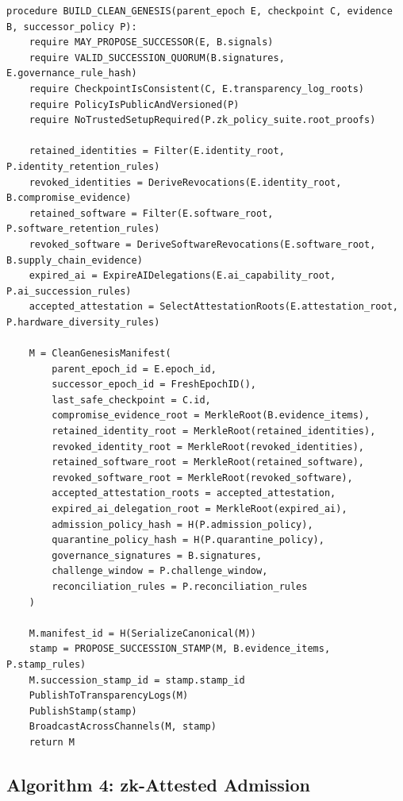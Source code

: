 \documentclass[11pt,letterpaper]{article}
\begin{document}
\begin{lstlisting}[caption={Constructing a Clean Genesis Manifest}]
procedure BUILD_CLEAN_GENESIS(parent_epoch E, checkpoint C, evidence B, successor_policy P):
    require MAY_PROPOSE_SUCCESSOR(E, B.signals)
    require VALID_SUCCESSION_QUORUM(B.signatures, E.governance_rule_hash)
    require CheckpointIsConsistent(C, E.transparency_log_roots)
    require PolicyIsPublicAndVersioned(P)
    require NoTrustedSetupRequired(P.zk_policy_suite.root_proofs)

    retained_identities = Filter(E.identity_root, P.identity_retention_rules)
    revoked_identities = DeriveRevocations(E.identity_root, B.compromise_evidence)
    retained_software = Filter(E.software_root, P.software_retention_rules)
    revoked_software = DeriveSoftwareRevocations(E.software_root, B.supply_chain_evidence)
    expired_ai = ExpireAIDelegations(E.ai_capability_root, P.ai_succession_rules)
    accepted_attestation = SelectAttestationRoots(E.attestation_root, P.hardware_diversity_rules)

    M = CleanGenesisManifest(
        parent_epoch_id = E.epoch_id,
        successor_epoch_id = FreshEpochID(),
        last_safe_checkpoint = C.id,
        compromise_evidence_root = MerkleRoot(B.evidence_items),
        retained_identity_root = MerkleRoot(retained_identities),
        revoked_identity_root = MerkleRoot(revoked_identities),
        retained_software_root = MerkleRoot(retained_software),
        revoked_software_root = MerkleRoot(revoked_software),
        accepted_attestation_roots = accepted_attestation,
        expired_ai_delegation_root = MerkleRoot(expired_ai),
        admission_policy_hash = H(P.admission_policy),
        quarantine_policy_hash = H(P.quarantine_policy),
        governance_signatures = B.signatures,
        challenge_window = P.challenge_window,
        reconciliation_rules = P.reconciliation_rules
    )

    M.manifest_id = H(SerializeCanonical(M))
    stamp = PROPOSE_SUCCESSION_STAMP(M, B.evidence_items, P.stamp_rules)
    M.succession_stamp_id = stamp.stamp_id
    PublishToTransparencyLogs(M)
    PublishStamp(stamp)
    BroadcastAcrossChannels(M, stamp)
    return M
\end{lstlisting}

\subsection{Algorithm 4: zk-Attested Admission}
\end{document}
